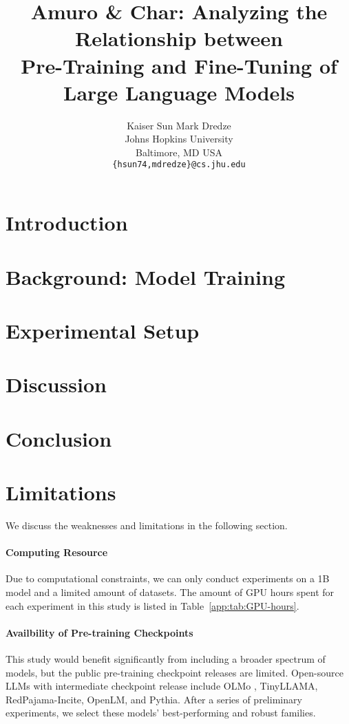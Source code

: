 \documentclass[11pt]{article}
\title{Amuro \& Char: Analyzing the Relationship between \\ Pre-Training and Fine-Tuning of Large Language Models}
\author{Kaiser Sun \quad Mark Dredze \\
 Johns Hopkins University
 \\ Baltimore, MD USA \\
\texttt{\{hsun74,mdredze\}@cs.jhu.edu}\\
}
\begin{document}
\maketitle
\begin{abstract}

\end{abstract}


\section{Introduction}


\section{Background: Model Training}



\section{Experimental Setup}






\section{Discussion}



\section{Conclusion}


\section*{Limitations}
We discuss the weaknesses and limitations in the following section.

\paragraph{Computing Resource}
Due to computational constraints, we can only conduct experiments on a 1B model and a limited amount of datasets.
The amount of GPU hours spent for each experiment in this study is listed in Table~\ref{app:tab:GPU-hours}.

\paragraph{Availbility of Pre-training Checkpoints}
This study would benefit significantly from including a broader spectrum of models, but the public pre-training checkpoint releases are limited.
Open-source LLMs with intermediate checkpoint release include OLMo \cite{groeneveld2024olmo}, TinyLLAMA, RedPajama-Incite, OpenLM, and Pythia.
After a series of preliminary experiments, we select these models' best-performing and robust families.
\end{document}
